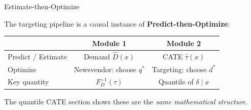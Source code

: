 \documentclass[aspectratio=169, 11pt, handout]{beamer}
\begin{document}
\begin{frame}{Estimate-then-Optimize}
 
The targeting pipeline is a causal instance of \textbf{Predict-then-Optimize}:
 
\bigskip
 
\begin{center}
\end{center}
 
\pause
\bigskip
 
\begin{center}
\small
\begin{tabular}{lcc}
\toprule
& \textbf{Module 1} & \textbf{Module 2} \\
\midrule
Predict / Estimate & Demand $\hat{D}(x)$ & CATE $\hat{\tau}(x)$ \\
Optimize & Newsvendor: choose $q^*$ & Targeting: choose $d^*$ \\
Key quantity & $F^{-1}_D(\tau)$ & Quantile of $\delta \mid x$ \\
\bottomrule
\end{tabular}
\end{center}
 
\medskip
 
The quantile CATE section shows these are the \emph{same mathematical structure}.
 
\end{frame}
 
\end{document}
